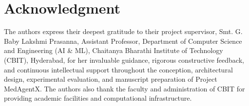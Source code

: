 \documentclass[journal,10pt,twocolumn]{IEEEtran}
\begin{document}
\section*{Acknowledgment}
The authors express their deepest gratitude to their project supervisor, Smt. G. Baby Lakshmi Prasanna, Assistant Professor, Department of Computer Science and Engineering (AI \& ML), Chaitanya Bharathi Institute of Technology (CBIT), Hyderabad, for her invaluable guidance, rigorous constructive feedback, and continuous intellectual support throughout the conception, architectural design, experimental evaluation, and manuscript preparation of Project MedAgentX. The authors also thank the faculty and administration of CBIT for providing academic facilities and computational infrastructure.



\end{document}
